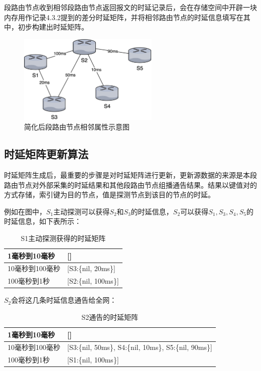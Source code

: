 段路由节点收到相邻段路由节点返回报文的时延记录后，会在存储空间中开辟一块内存用作记录4.3.2提到的差分时延矩阵，并将相邻路由节点的时延信息填写在其中，初步构建出时延矩阵。

\begin{figure}[htbp]
\setlength{\abovecaptionskip}{15pt plus 3pt minus 2pt}
\centerline{\includegraphics[width=0.6\textwidth]{./figures/ch4-simple-topo.png}}
\caption{简化后段路由节点相邻属性示意图}
\label{fig-ch4-simple-topo}
\end{figure}

\subsection{时延矩阵更新算法}

时延矩阵生成后，最重要的步骤是对时延矩阵进行更新，更新源数据的来源是本段路由节点对外部采集的时延结果和其他段路由节点组播通告结果。结果以键值对的方式存储，索引键为目的节点，值是探测节点到该目的节点的时延。

例如在图中，$S_1$主动探测可以获得$S_2$和$S_3$的时延信息，$S_2$可以获得$S_1, S_3, S_4, S_5$的时延信息，如下表所示：

\begin{table}[htbp]
\begin{tabular}{|p{}|p{}|}
\hline
1毫秒到10毫秒 & {[}{]} \\ \hline
10毫秒到100毫秒 & {[}S3:\{nil, 20ms\}{]} \\ \hline
100毫秒到1秒 & {[}S2:\{nil, 100ms\}{]} \\ \hline
\end{tabular}
\caption{S1主动探测获得的时延矩阵}
\label{table-S1-get}
\end{table}

$S_2$会将这几条时延信息通告给全网：

\begin{table}[htbp]
\begin{tabular}{|p{}|p{}|}\hline
1毫秒到10毫秒 & {[}{]} \\ \hline
10毫秒到100毫秒 & {[}S3:\{nil, 50ms\}, S4:\{nil, 10ms\}, S5:\{nil, 90ms\}{]} \\ \hline
100毫秒到1秒 & {[}S1:\{nil, 100ms\}{]} \\ \hline
\end{tabular}
\caption{S2通告的时延矩阵}
\label{table-S2-adverse}
\end{table}

